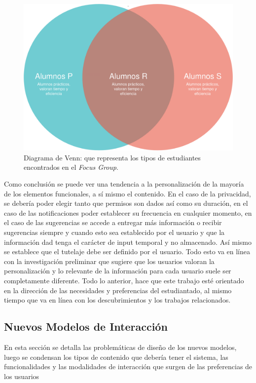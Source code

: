     \begin{figure}[h]
        \centering
        \includegraphics[scale=0.2]{media/imagenes/focus_groups/Tipos_de_alumnos-Diagrama_de_Venn.png}
        \caption{Diagrama de Venn: que representa los tipos de estudiantes encontrados en el \textit{Focus Group}.}
        \label{fig:alumnosVenn}
    \end{figure}
    \par Como conclusión se puede ver una tendencia a la personalización de la mayoría de los elementos funcionales, a sí mismo el contenido. En el caso de la privacidad, se debería poder elegir tanto que permisos son dados así como su duración, en el caso de las notificaciones poder establecer su frecuencia en cualquier momento, en el caso de las sugerencias se accede a entregar más información o recibir sugerencias siempre y cuando esto sea establecido por el usuario y que la información dad tenga el carácter de input temporal y no almacenado. Así mismo se establece que el tutelaje debe ser definido por el usuario. Todo esto va en línea con la investigación preliminar que sugiere que los usuarios valoran la personalización y lo relevante de la información para cada usuario suele ser completamente diferente. Todo lo anterior, hace que este trabajo esté orientado en la dirección de las necesidades y preferencias del estudiantado, al mismo tiempo que va en línea con los descubrimientos y los trabajos relacionados.

\subsection{Nuevos Modelos de Interacción}
    \par En esta sección se detalla las problemáticas de diseño de los nuevos modelos, luego se condensan los tipos de contenido que debería tener el sistema, las funcionalidades y las modalidades de interacción que surgen de las preferencias de los usuarios
